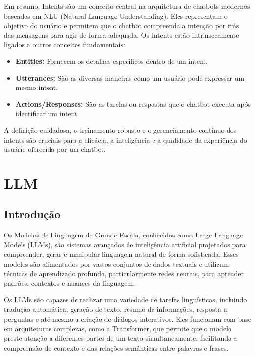 \documentclass[14pt,a4paper,oneside]{book}
\begin{document}
Em resumo, Intents são um conceito central na arquitetura de chatbots modernos baseados em NLU (Natural Language Understanding). Eles representam o objetivo do usuário e permitem que o chatbot compreenda a intenção por trás das mensagens para agir de forma adequada. Os Intents estão intrinsecamente ligados a outros conceitos fundamentais:
\begin{itemize}
    \item \textbf{Entities:} Fornecem os detalhes específicos dentro de um intent.
    \item \textbf{Utterances:} São as diversas maneiras como um usuário pode expressar um mesmo intent.
    \item \textbf{Actions/Responses:} São as tarefas ou respostas que o chatbot executa após identificar um intent.
\end{itemize}
A definição cuidadosa, o treinamento robusto e o gerenciamento contínuo dos intents são cruciais para a eficácia, a inteligência e a qualidade da experiência do usuário oferecida por um chatbot.


\chapter{LLM}

\section{Introdução}

Os Modelos de Linguagem de Grande Escala, conhecidos como Large Language Models (LLMs), são sistemas avançados de inteligência artificial projetados para compreender, gerar e manipular linguagem natural de forma sofisticada. Esses modelos são alimentados por vastos conjuntos de dados textuais e utilizam técnicas de aprendizado profundo, particularmente redes neurais, para aprender padrões, contextos e nuances da linguagem.

Os LLMs são capazes de realizar uma variedade de tarefas linguísticas, incluindo tradução automática, geração de texto, resumo de informações, resposta a perguntas e até mesmo a criação de diálogos interativos. Eles funcionam com base em arquiteturas complexas, como a Transformer, que permite que o modelo preste atenção a diferentes partes de um texto simultaneamente, facilitando a compreensão do contexto e das relações semânticas entre palavras e frases.
\end{document}
